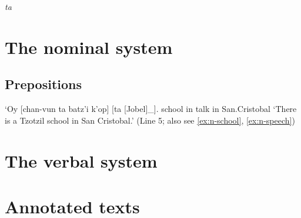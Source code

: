 \documentclass[12pt]{article}
\newcommand*{\form}[1]{\emph{#1}}
\newcommand{\translate}[1]{`#1'}
\def\\{}%
\begin{document}
\form{ta}

\section{The nominal system}

\subsection{Prepositions}

\begin{exe}
    \ex \gll `Oy [chan-vun ta batz'i k'op] [ta [Jobel]_{}]. \\
    {} school in {} talk in San.Cristobal \\
    \glt \translate{There is a Tzotzil school in San Cristobal.} (Line 5;
    also see \ref{ex:n-school}, \ref{ex:n-speech})
    \ex 
\end{exe}

\section{The verbal system}



\section{Annotated texts}
\end{document}
